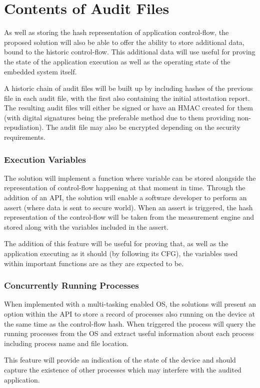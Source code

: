\section{Contents of Audit Files}

As well as storing the hash representation of application control-flow, the proposed solution will also be able to offer the ability to store additional data, bound to the historic control-flow. This additional data will use useful for proving the state of the application execution as well as the operating state of the embedded system itself.

A historic chain of audit files will be built up by including hashes of the previous file in each audit file, with the first also containing the initial attestation report. The resulting audit files will either be signed or have an HMAC created for them (with digital signatures being the preferable method due to them providing non-repudiation). The audit file may also be encrypted depending on the security requirements. 

\subsubsection*{Execution Variables}

The solution will implement a function where variable can be stored alongside the representation of control-flow happening at that moment in time. Through the addition of an API, the solution will enable a software developer to perform an assert (where data is sent to secure world). When an assert is triggered, the hash representation of the control-flow will be taken from the measurement engine and stored along with the variables included in the assert.

The addition of this feature will be useful for proving that, as well as the application executing as it should (by following its CFG), the variables used within important functions are as they are expected to be.

\subsubsection*{Concurrently Running Processes}

When implemented with a multi-tasking enabled OS, the solutions will present an option within the API to store a record of processes also running on the device  at the same time as the control-flow hash. When triggered the process will query the running processes from the OS and extract useful information about each process including process name and file location.

This feature will provide an indication of the state of the device and should capture the existence of other processes which may interfere with the audited application. 
